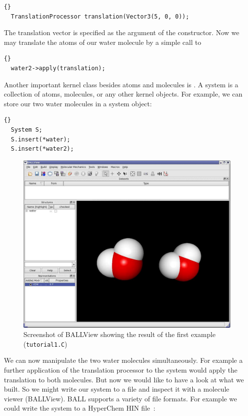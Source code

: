 \begin{lstlisting}{}
  TranslationProcessor translation(Vector3(5, 0, 0));
\end{lstlisting}
	
\noindent
The translation vector is specified as the argument of the constructor. Now we
may translate the atoms of our water molecule by a simple call to 

\begin{lstlisting}{}
  water2->apply(translation);
\end{lstlisting}

\noindent
Another important kernel class besides atoms and molecules is .
A system is a collection of atoms, molecules, or any other kernel objects. For
example, we can store our two water molecules in a system object:

\begin{lstlisting}{}
  System S;
  S.insert(*water);
  S.insert(*water2);
\end{lstlisting}

\begin{figure}[t]
  \centering
  \includegraphics[width=\textwidth]{tut1_screenshot}
  \caption{Screenshot of BALLView showing the result of the first example
           ({\tt tutorial1.C})}
  \label{fig:tut1-screenshot}
\end{figure}

\noindent
We can now manipulate the two water molecules simultaneously. For example a
further application of the translation processor to the system would apply
the translation to both molecules.
But now we would like to have a look at what we built. So we might write our
system to a file and inspect it with a molecule viewer (\eg BALLView).
BALL supports a variety of file formats. For example we could write the system
to a HyperChem HIN file~\cite{HyperChem}: \label{useofstreams}

